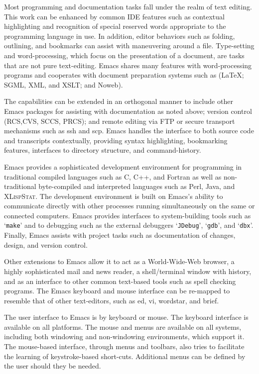 \documentclass{article}
\newcommand*{\XLispStat}{\textsc{XLispStat}}
\newcommand{\stexttt}[1]{{\small\texttt{#1}}}
\newcommand{\file}[1]{`\stexttt{#1}'}
\begin{document}
Most programming and documentation tasks fall under the realm of text
editing.  This work can be enhanced by common IDE features such as
contextual highlighting and recognition of special reserved words
appropriate to the programming language in use.  In addition, editor
behaviors such as folding, outlining, and bookmarks can assist with
maneuvering around a file.  Type-setting and word-processing, which
focus on the presentation of a document, are tasks that are not pure
text-editing.  Emacs shares many features with word-processing
programs and cooperates with document preparation systems such as
(\LaTeX; SGML, XML, and XSLT; and Noweb).

The capabilities can be extended in an orthogonal manner to include
other Emacs packages for assisting with documentation as noted above;
version control (RCS,CVS, SCCS, PRCS); and remote editing via FTP or
secure transport mechanisms such as ssh and scp.  Emacs handles the
interface to both source code and transcripts contextually, providing
syntax highlighting, bookmarking features, interfaces to directory
structure, and command-history.

Emacs provides a sophisticated development environment for programming
in traditional compiled languages such as C, C++, and Fortran as well
as non-traditional byte-compiled and interpreted languages such as
Perl, Java, and \XLispStat.  The development environment is built on Emacs's
ability to communicate directly with other processes running simultaneously
on the same or connected computers.
Emacs provides interfaces to system-building tools such as
\file{make} and to debugging such as the external debuggers
\file{JDebug}, \file{gdb}, and \file{dbx}.  Finally, Emacs assists with
project tasks
such as documentation of changes, design, and version control.

Other extensions to Emacs allow it to act as a World-Wide-Web browser,
a highly sophisticated mail and news reader, a shell/terminal window
with history, and as an interface to other common text-based tools
such as spell checking programs.  The Emacs keyboard and mouse
interface can be re-mapped to resemble that of other text-editors,
such as ed, vi, wordstar, and brief.

The user interface to Emacs is by keyboard or mouse.  The keyboard
interface is available on all platforms.  The mouse and menus are
available on all systems, including both windowing and non-windowing
environments, which support it.  The mouse-based interface, through
menus and toolbars, also tries to facilitate the learning of
keystroke-based short-cuts.  Additional menus can be defined by the
user should they be needed.
\end{document}
